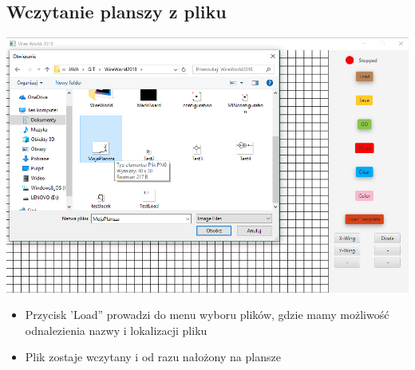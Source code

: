 \documentclass[a4paper,11pt]{article}
\begin{document}
\subsection{Wczytanie planszy z pliku}
\includegraphics[width=\textwidth]{load}
\begin{itemize}
\item Przycisk 'Load'' prowadzi do menu wyboru plików, gdzie mamy możliwość odnalezienia nazwy i lokalizacji pliku
\item Plik zostaje wczytany i  od razu nałożony na plansze
\end{itemize}
\end{document}
